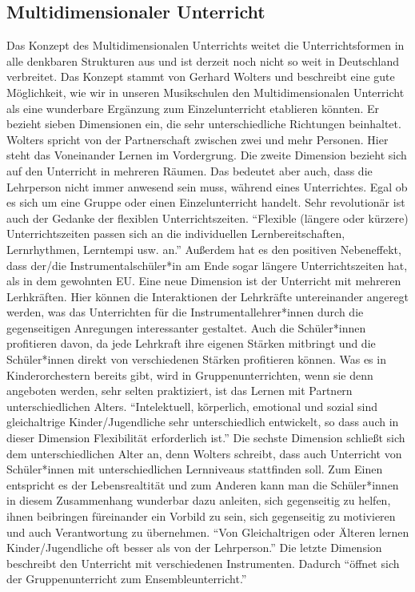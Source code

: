 \subsection{Multidimensionaler Unterricht} 
Das Konzept des Multidimensionalen Unterrichts weitet die Unterrichtsformen in
alle denkbaren Strukturen aus und ist derzeit noch nicht so weit in Deutschland
verbreitet. Das Konzept stammt von Gerhard Wolters und beschreibt eine gute
Möglichkeit, wie wir in unseren Musikschulen den Multidimensionalen Unterricht
als eine wunderbare Ergänzung zum Einzelunterricht etablieren könnten. Er
bezieht sieben Dimensionen ein, die sehr unterschiedliche Richtungen beinhaltet.
\autocite[86ff]{ernst:die_zukunftsfaehige_musikschule} Wolters spricht von der
Partnerschaft zwischen zwei und mehr Personen. Hier steht das Voneinander Lernen
im Vordergrung. Die zweite Dimension bezieht sich auf den Unterricht in mehreren
Räumen. Das bedeutet aber auch, dass die Lehrperson nicht immer anwesend sein
muss, während eines Unterrichtes. Egal ob es sich um eine Gruppe oder einen
Einzelunterricht handelt. Sehr revolutionär ist auch der Gedanke der flexiblen
Unterrichtszeiten. \enquote{Flexible (längere oder kürzere) Unterrichtszeiten
passen sich an die individuellen Lernbereitschaften, Lernrhythmen, Lerntempi
usw. an.} \autocite[87]{ernst:die_zukunftsfaehige_musikschule} Außerdem hat es
den positiven Nebeneffekt, dass der/die Instrumentalschüler*in am Ende sogar
längere Unterrichtszeiten hat, als in dem gewohnten EU. Eine neue Dimension ist
der Unterricht mit mehreren Lerhkräften. Hier können die Interaktionen der
Lehrkräfte untereinander angeregt werden, was das Unterrichten für die
Instrumentallehrer*innen durch die gegenseitigen Anregungen interessanter
gestaltet. Auch die Schüler*innen profitieren davon, da jede Lehrkraft ihre
eigenen Stärken mitbringt und die Schüler*innen direkt von verschiedenen Stärken
profitieren können. Was es in Kinderorchestern bereits gibt, wird in
Gruppenunterrichten, wenn sie denn angeboten werden, sehr selten praktiziert,
ist das Lernen mit Partnern unterschiedlichen Alters. \enquote{Intelektuell,
körperlich, emotional und sozial sind gleichaltrige Kinder/Jugendliche sehr
unterschiedlich entwickelt, so dass auch in dieser Dimension Flexibilität
erforderlich ist.} \autocite[87]{ernst:die_zukunftsfaehige_musikschule} Die
sechste Dimension schließt sich dem unterschiedlichen Alter an, denn Wolters
schreibt, dass auch Unterricht von Schüler*innen mit unterschiedlichen
Lernniveaus stattfinden soll. Zum Einen entspricht es der Lebensrealtität und
zum Anderen kann man die Schüler*innen in diesem Zusammenhang wunderbar dazu
anleiten, sich gegenseitig zu helfen, ihnen beibringen füreinander ein Vorbild
zu sein, sich gegenseitig zu motivieren und auch Verantwortung zu übernehmen.
\enquote{Von Gleichaltrigen oder Älteren lernen Kinder/Jugendliche oft besser
als von der Lehrperson.} \autocite[87]{ernst:die_zukunftsfaehige_musikschule}
Die letzte Dimension beschreibt den Unterricht mit verschiedenen Instrumenten.
Dadurch
\enquote{öffnet sich der Gruppenunterricht zum Ensembleunterricht.}
\autocite[87]{ernst:die_zukunftsfaehige_musikschule}

